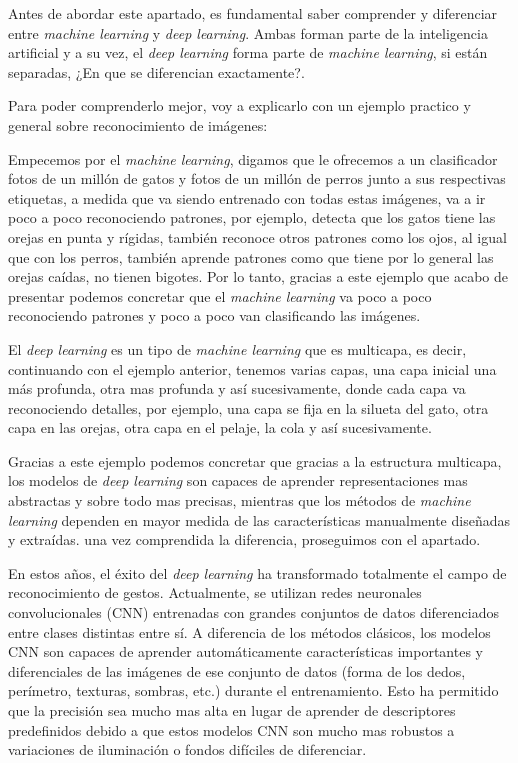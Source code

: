 Antes de abordar este apartado, es fundamental saber comprender y diferenciar entre \textit{machine learning} y \textit{deep learning}. Ambas forman parte de la inteligencia artificial y a su vez, el  \textit{deep learning} forma parte de \textit{machine learning}, si están separadas, ¿En que se diferencian exactamente?.


Para poder comprenderlo mejor, voy a explicarlo con un ejemplo practico y general sobre reconocimiento de imágenes: 

Empecemos por el \textit{machine learning}, digamos que le ofrecemos a un clasificador fotos de un millón de gatos y fotos de un millón de perros junto a sus respectivas etiquetas, a medida que va siendo entrenado con todas estas imágenes, va a ir poco a poco reconociendo patrones, por ejemplo, detecta que los gatos tiene las orejas en punta y rígidas, también reconoce otros patrones como los ojos, al igual que con los perros, también aprende patrones como que tiene por lo general las orejas caídas, no tienen bigotes. Por lo tanto, gracias a este ejemplo que acabo de presentar podemos concretar que el \textit{machine learning} va poco a poco reconociendo patrones y poco a poco van clasificando las imágenes. 

El \textit{deep learning} es un tipo de \textit{machine learning} que es multicapa, es decir, continuando con el ejemplo anterior, tenemos varias capas, una capa inicial  una más profunda, otra mas profunda y así sucesivamente, donde cada capa va reconociendo detalles, por ejemplo, una capa se fija en la silueta del gato, otra capa en las orejas, otra capa en el pelaje, la cola y así sucesivamente.

Gracias a este ejemplo podemos concretar que gracias a la estructura multicapa, los modelos de \textit{deep learning} son capaces de aprender representaciones mas abstractas y sobre todo mas precisas, mientras que los métodos de \textit{machine learning} dependen en mayor medida de las características manualmente diseñadas y extraídas. una vez comprendida la diferencia, proseguimos con el apartado.

En estos años, el éxito del \textit{deep learning} ha transformado totalmente el campo de reconocimiento de gestos. Actualmente, se utilizan redes neuronales convolucionales (CNN) entrenadas con grandes conjuntos de datos diferenciados entre clases distintas entre sí. A diferencia de los métodos clásicos, los modelos CNN son capaces de aprender automáticamente características importantes y diferenciales de las imágenes de ese conjunto de datos (forma de los dedos, perímetro, texturas, sombras, etc.) durante el entrenamiento. Esto ha permitido que la precisión sea mucho mas alta en lugar de aprender de descriptores predefinidos debido a que estos modelos CNN son mucho mas robustos a variaciones de iluminación o fondos difíciles de diferenciar.

